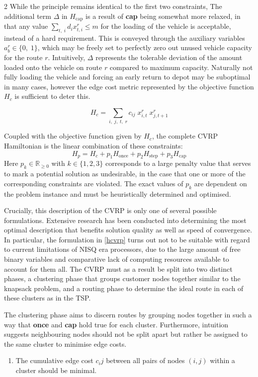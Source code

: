 \documentclass [10pt]{article}
\begin{document}
\begin {multicols}{2}
While the principle remains identical to the first two constraints,
The additional term $\Delta$ in $H_{\text{cap}}$ is a result of \textbf{cap}
being somewhat more relaxed, in that any value
$\sum_{t, \; i} d_i x_{t, i}^r \leq m$
for the loading of the vehicle is acceptable, instead of a hard requirement.
This is conveyed through the auxiliary variables $a_b^r \in \{0, \; 1\}$,
which may be freely set to perfectly zero out unused vehicle capacity for the
route $r$. Intuitively, $\Delta$ represents the tolerable deviation of the
amount loaded onto the vehicle on route $r$ compared to maximum capacity.
Naturally not fully loading the vehicle and forcing an early return to depot
may be suboptimal in many cases, however the edge cost metric represented by
the objective function $H_c$ is sufficient to deter this.

\begin {equation}
H_c = \sum_{i, \; j, \; t, \; r} c_{ij} \; x_{i, t}^r \; x_{j, t+1}^r
\end {equation}

Coupled with the objective function given by $H_c$, the complete CVRP
Hamiltonian is the linear combination of these constraints:
\begin {equation}
\label {hcvrp}
H_p = H_c + p_1 H_{\text{once}} + p_2 H_{\text{step}} + p_3 H_{\text{cap}}
\end {equation}
Here $p_k \in \mathbb R_{\ge 0}$ with $k \in \{1, 2, 3\}$ corresponds to a
large penalty value that serves to mark a potential solution as undesirable,
in the case that one or more of the corresponding constraints are violated.
The exact values of $p_k$ are dependent on the problem instance and must be
heuristically determined and optimised.

Crucially, this description of the CVRP is only one of several possible
formulations. Extensive research has been conducted into determining the most
optimal description that benefits solution quality as well as speed of
convergence. In particular, the formulation in \eqref{hcvrp} turns out not to
be suitable with regard to current limitations of NISQ era processors, due to
the large amount of free binary variables and comparative lack of computing
resources available to account for them all. The CVRP must as a result be
split into two distinct phases, a clustering phase that groups customer nodes
together similar to the knapsack problem, and a routing phase to determine the
ideal route in each of these clusters as in the TSP.

The clustering phase aims to discern routes by grouping nodes together in such
a way that \textbf{once} and \textbf{cap} hold true for each cluster.
Furthermore, intuition suggests neighbouring nodes should not be split apart
but rather be assigned to the same cluster to minimise edge costs.
\begin {enumerate}[label=\textbf{cluster}, align=left]
\item The cumulative edge cost $c_ij$ between all pairs of
	nodes $(i, j)$ within a cluster should be minimal.
\end {enumerate}


\end{multicols}
\end{document}
